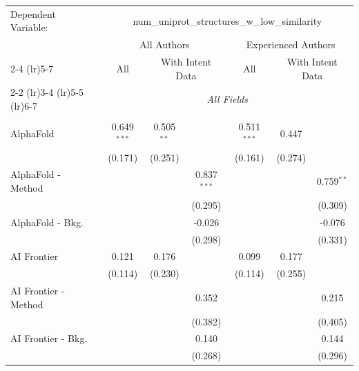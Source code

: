 \begingroup
\centering
\begin{tabular}{lcccccc}
   \tabularnewline \midrule \midrule
   Dependent Variable: & \multicolumn{6}{c}{num\_uniprot\_structures\_w\_low\_similarity}\\
 & \multicolumn{3}{c}{All Authors} & \multicolumn{3}{c}{Experienced Authors} \\
\cmidrule(lr){2-4} \cmidrule(lr){5-7}
 & \multicolumn{1}{c}{All} & \multicolumn{2}{c}{With Intent Data} & \multicolumn{1}{c}{All} & \multicolumn{2}{c}{With Intent Data} \\
\cmidrule(lr){2-2} \cmidrule(lr){3-4} \cmidrule(lr){5-5} \cmidrule(lr){6-7}
 & \multicolumn{6}{c}{\textit{All Fields}} \\ \\
   AlphaFold            & 0.649$^{***}$ & 0.505$^{**}$  &               & 0.511$^{***}$ & 0.447          &   \\   
                        & (0.171)       & (0.251)       &               & (0.161)       & (0.274)        &   \\   
   AlphaFold - Method   &               &               & 0.837$^{***}$ &               &                & 0.759$^{**}$\\   
                        &               &               & (0.295)       &               &                & (0.309)\\   
   AlphaFold - Bkg.     &               &               & -0.026        &               &                & -0.076\\   
                        &               &               & (0.298)       &               &                & (0.331)\\   
   AI Frontier          & 0.121         & 0.176         &               & 0.099         & 0.177          &   \\   
                        & (0.114)       & (0.230)       &               & (0.114)       & (0.255)        &   \\   
   AI Frontier - Method &               &               & 0.352         &               &                & 0.215\\   
                        &               &               & (0.382)       &               &                & (0.405)\\   
   AI Frontier - Bkg.   &               &               & 0.140         &               &                & 0.144\\   
                        &               &               & (0.268)       &               &                & (0.296)\\   

\end{tabular}

